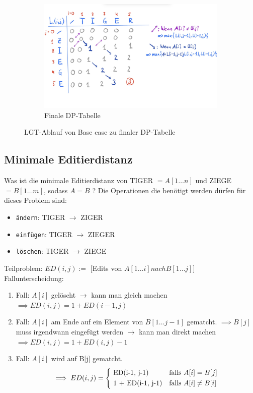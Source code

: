 \documentclass[a4paper]{article}
\begin{document}
\begin{figure}[h]
\begin{subfigure}{0.7\textwidth}
 \includegraphics[width=\textwidth]{Pictures/LGT2.jpg}
        \caption{Finale DP-Tabelle}
        \label{fig:LGT02}
\end{subfigure}
\caption{LGT-Ablauf von Base case zu finaler DP-Tabelle}
\label{fig:LGT-Ablauf}
\end{figure}

\subsection{Minimale Editierdistanz}
Was ist die minimale Editierdistanz von \textsc{TIGER} $= A[1\dots n]$ und \textsc{ZIEGE} $= B[1\dots m]$, sodass $A = B$ ?
Die Operationen die benötigt werden dürfen für dieses Problem sind:
\begin{itemize}
    \item \texttt{ändern}: TIGER $\rightarrow$ ZIGER
    \item \texttt{einfügen}: TIGER $\rightarrow$ ZIEGER
    \item \texttt{löschen}: TIGER $\rightarrow$ ZIEGE    
\end{itemize}

Teilproblem: $ED(i, j) :=$ [Edits von $A[1\dots i] nach B[1\dots j]$] \\

Fallunterscheidung:
\begin{enumerate}
    \item Fall: $A[i]$ gelöscht $\rightarrow$ kann man gleich machen $\implies ED(i, j) = 1 + ED(i-1, j)$ 
    \item Fall: $A[i]$ am Ende auf ein Element von $B[1\dots j-1]$ gematcht. $\implies B[j]$ muss irgendwann eingefügt werden $\rightarrow$ kann man direkt machen $\implies ED(i, j) = 1 + ED(i, j)-1$
    \item Fall: $A[i]$ wird auf B[j] gematcht. 
    \begin{equation*}
    \implies ED(i, j)  =
        \begin{cases*}
           $ ED(i-1, j-1)$ &  falls $ A[i] = B[j] $\\
           $ 1 + ED(i-1, j-1)$ &  falls $ A[i] \neq B[i]$ 
        \end{cases*}
    \end{equation*}
\end{enumerate}
\end{document}

